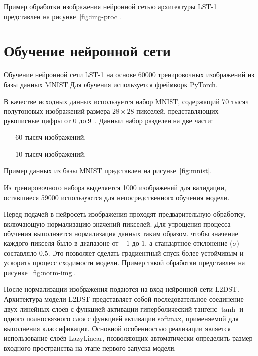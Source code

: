 Пример обработки изображения нейронной сетью архитектуры LST-1 представлен на 
рисунке~\ref{fig:img-proc}\cite{LST2D}.


\section{Обучение нейронной сети}
\hspace*{12.5 mm}Обучение нейронной сети LST-1 на основе 60000 тренировочных 
изображений из базы данных MNIST.\@ Для обучения используется фреймворк 
PyTorch.\@

В качестве исходных данных используется набор MNIST, 
содержащий 70 тысяч полутоновых изображений размера $28 \times 28$ пикселей, 
представляющих рукописные цифры от 0 до 9~\cite{MNIST}. Данный набор разделен 
на две части:

  –  – 60 тысяч изображений.

  –  – 10 тысяч изображений.

    Пример данных из базы MNIST представлен на рисунке~\ref{fig:mnist}.


Из тренировочного набора 
выделяется 1000 изображений для валидации, оставшиеся 59000 используются для 
непосредственного обучения модели. 

Перед подачей в нейросеть изображения проходят предварительную обработку, 
включающую нормализацию значений пикселей. Для упрощения 
процесса обучения выполняется нормализация данных таким образом, чтобы значение 
каждого пикселя было в диапазоне от $-1$ до $1$, а стандартное отклонение 
($\sigma$) составляло $0.5$. Это позволяет сделать градиентный спуск более 
устойчивым и ускорить процесс сходимости модели. Пример такой обработки 
представлен на рисунке~\ref{fig:norm-img}.


После нормализации изображения подаются на вход нейронной сети L2DST. 
Архитектура модели L2DST представляет собой последовательное соединение двух 
линейных слоёв с функцией активации гиперболический тангенс \(\tanh\) и одного 
полносвязного слоя с функцией активации softmax, применяемой для выполнения 
классификации. Основной особенностью реализации является использование слоёв 
LazyLinear, позволяющих автоматически определить размер входного пространства 
на этапе первого запуска модели.


